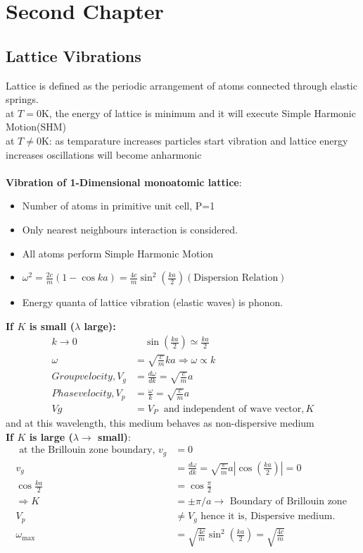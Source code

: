 \chapter{Second Chapter}
\section{Lattice Vibrations}
Lattice is defined as the periodic arrangement of atoms connected through elastic springs.\\
at $T=0\text{K}$, the energy of lattice is minimum and it will execute Simple Harmonic Motion(SHM)\\
at $T\neq0\text{K}$: as temparature increases particles start vibration and lattice energy increases oscillations will become anharmonic\\\\
\textbf{Vibration of 1-Dimensional monoatomic lattice}:
\begin{itemize}
	\item Number of atoms in primitive unit cell, P=1
\item Only nearest neighbours interaction is considered.
\item All atoms perform Simple Harmonic Motion 
\item $\omega^{2}=\frac{2 c}{m}(1-\cos k a)=\frac{4 c}{m} \sin ^{2}\left(\frac{k a}{2}\right)(\text{Dispersion Relation})$
\item Energy quanta of lattice vibration (elastic waves) is phonon.
\end{itemize}
\textbf{If $K$ is small ($\lambda$ large):}
\begin{align*}
k \rightarrow 0 &\quad \sin \left(\frac{k a}{2}\right) \simeq \frac{k a}{2}\\
\omega&=\sqrt{\frac{c}{m}} k a \Rightarrow \omega \propto k\\
Group velocity,V_{g}&=\frac{d \omega}{d k}=\sqrt{\frac{c}{m}} a\\
Phase velocity,V_{p}&=\frac{\omega}{k}=\sqrt{\frac{c}{m}} a\\
V g&=V_{P} \ \text { and independent of wave vector}, K
\end{align*}
 and at this wavelength, this medium behaves as non-dispersive medium\\
\textbf{If $K$ is large ($\lambda\rightarrow$ small)}:
\begin{align*}
\text { at the Brillouin zone boundary, } v_{g}&=0\\
v_{g}&=\frac{d \omega}{d k}=\sqrt{\frac{c}{m}} a\left|\cos \left(\frac{k a}{2}\right)\right|=0\\
\cos \frac{k a}{2}&=\cos \frac{\pi}{2}\\
\Rightarrow K&=\pm \pi / a \rightarrow \text { Boundary of Brillouin zone } \\
V_{p} &\neq V_{g} \text { hence it is, Dispersive medium. }\\
\omega_{\max }&=\sqrt{\frac{4 c}{m}} \sin ^{2}\left(\frac{k a}{2}\right)=\sqrt{\frac{4 c}{m}}
\end{align*}
